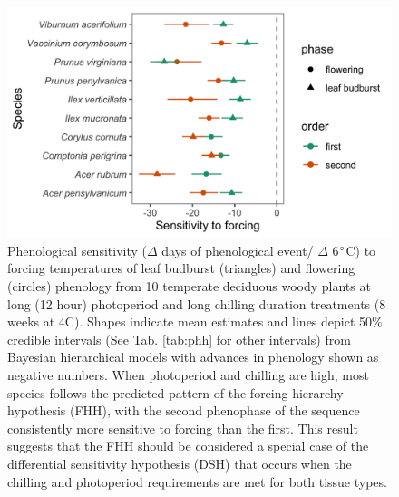 \documentclass[12pt]{article}\usepackage[]{graphicx}\usepackage[]{color}
\begin{document}
\begin{figure}[h!]
    \centering
         \includegraphics[width=\textwidth]{..//Plots/Flobuds_manuscript_figs/PHH_plot.png} 
    \caption{Phenological sensitivity ($\Delta$ days of phenological event/ $\Delta$ 6$\degree$C) to forcing temperatures of leaf budburst (triangles) and flowering (circles) phenology from 10 temperate deciduous woody plants at long (12 hour) photoperiod and long chilling duration treatments (8 weeks at 4\degree C). Shapes indicate mean estimates and lines depict 50\% credible intervals (See Tab. \ref{tab:phh} for other intervals) from Bayesian hierarchical models with advances in phenology shown as negative numbers. When photoperiod and chilling are high, most species follows the predicted pattern of the forcing hierarchy hypothesis (FHH), with the second phenophase of the sequence consistently more sensitive to forcing than the first. This result suggests that the FHH should be considered a special case of the differential sensitivity hypothesis (DSH) that occurs when the chilling and photoperiod requirements are met for both tissue types.}
    \label{fig:FHH}
\end{figure}
\end{document}
